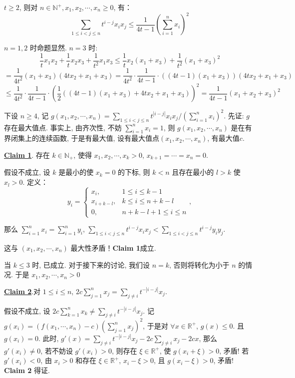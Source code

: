 \documentclass[lang=cn,12pt,thmcnt=section]{elegantbook}
\begin{document}
\begin{lemma}
$t\geq2$, 则对 $ n\in\mathbb{N}^{+},x_1,x_2,\cdots,x_n\geq0$, 有：
\[
\sum_{1\leq i < j\leq n}t^{i - j}x_ix_j\leq\frac{1}{4t - 1}\left(\sum_{i = 1}^{n}x_i\right)^2
\]
\end{lemma}

\begin{solution}
$n = 1,2$ 时命题显然. $n = 3$ 时: 
\[
\frac{1}{t}x_{1}x_{2}+\frac{1}{t}x_{2}x_{3}+\frac{1}{t^{2}}x_{1}x_{3} \leq \frac{1}{t}x_{2}(x_{1}+x_{3})+\frac{1}{t^{2}}(x_{1}+x_{3})^{2}
\]
\[
=\frac{1}{4t^{2}}(x_{1}+x_{3})(4tx_{2}+x_{1}+x_{3})=\frac{1}{4t^{2}}\cdot\frac{1}{4t - 1}\cdot((4t - 1)(x_{1}+x_{3}))(4tx_{2}+x_{1}+x_{3})
\]
\[
\leq\frac{1}{4t^{2}}\cdot\frac{1}{4t - 1}\cdot(\frac{1}{2}((4t - 1)(x_{1}+x_{3})+4tx_{2}+x_{1}+x_{3}))^{2}=\frac{1}{4t - 1}(x_{1}+x_{2}+x_{3})^{2}
\]

下设 $n\geq4$, 记 $g(x_{1},x_{2},\cdots,x_{n})={\sum_{1 \leq i<j \leq n}t^{|i - j|}x_{i}x_{j}}/{(\sum_{i = 1}^{n}x_{i})^{2}}$. 先证: $g$ 存在最大值点. 事实上, 由齐次性, 不妨 $\sum_{i = 1}^{n}x_{i}=1$, 则 $g(x_{1},x_{2},\cdots,x_{n})$ 是在有界闭集上的连续函数, 于是有最大值, 设有最大值点$(x_1, x_2, \cdots, x_n)$, 有最大值$c$. 

\underline{\textbf{Claim 1}}. 存在 \(k\in \mathbb{N}_+\), 使得 \(x_1,x_2,\cdots,x_k > 0\), \(x_{k + 1}=\cdots=x_n = 0\).

假设不成立, 设 \(k\) 是最小的使 \(x_k = 0\) 的下标, 则 \(k < n\) 且存在最小的 \(l>k\) 使 \(x_l>0\).
定义：
\[
y_i=\begin{cases}x_i, & 1\leq i\leq k - 1\\x_{i + k - l},&k\leq i\leq n + k - l\\0,&n + k - l+1\leq i\leq n\end{cases},
\]

那么 \(\sum_{i = 1}^{n}x_i=\sum_{i = 1}^{n}y_i\), \(\sum_{1\leq i<j\leq n}t^{i-j}x_ix_j<\sum_{1\leq i<j\leq n}t^{i-j}y_iy_j\).

这与 \((x_1,x_2,\cdots,x_n)\) 最大性矛盾！\textbf{Claim 1}成立.

当 \(k\leq3\) 时, 已成立. 对于接下来的讨论, 我们设 \(n = k\), 否则将转化为小于 \(n\) 的情况.
于是 \(x_1,x_2,\cdots,x_n>0\)

\underline{\textbf{Claim 2}}.对 \( 1 \leq i \leq n \), \( 2c \sum_{j = 1}^{n} x_j = \sum_{j \neq i} t^{-|i - j|} x_j \).

假设不成立, 设 \( 2c \sum_{k = 1}^{n} x_k \neq \sum_{j \neq i} t^{-|i - j|} x_j \). 记 \( g(x_i) = (f(x_1, \cdots, x_n) - c) (\sum_{j = 1}^{n} x_j)^2 \),
于是对 \( \forall x \in \mathbb{R}^+ \), \( g(x) \leq 0 \). 且 \( g(x_i) = 0 \). 此时,
\( g'(x) = \sum_{j \neq i} t^{-|i - j|} x_j - 2c \sum_{j \neq i} x_j - 2cx \), 那么 \( g'(x_i) \neq 0 \), 若不妨设 \( g'(x_i) > 0 \),
则存在 \( \xi \in \mathbb{R}^+ \), 使 \( g(x_i + \xi) > 0 \), 矛盾! 若 \( g'(x_i) < 0 \), 由 \( x_i > 0 \) 和存在 \( \xi \in \mathbb{R}^+ \),
\( x_i - \xi > 0 \), 且 \( g(x_i - \xi) > 0 \), 矛盾! \textbf{Claim 2} 得证.


\end{solution}
\end{document}
